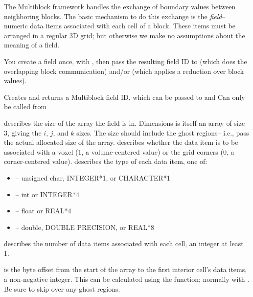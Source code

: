 \documentclass[10pt]{article}
\begin{document}
The Multiblock framework handles the exchange of boundary values 
between neighboring blocks.
The basic mechanism to do this exchange is the {\em field}-- numeric data items 
associated with each cell of a block. These items must be arranged in a regular
3D grid; but otherwise we make no assumptions about the meaning of a
field.

You create a field once, with , then pass the resulting 
field ID to  (which does the
overlapping block communication) and/or  (which 
applies a reduction over block values).


\vspace{0.2in}
     Creates and returns a Multiblock field ID, which can be passed to
 and   Can only be called from

      describes the size of the array the field is in.
	Dimensions is itself an array of size 3, giving the $i$, $j$, and $k$ sizes.
	The size should include the ghost regions-- i.e., pass the actual allocated
	size of the array.
      describes whether the data item is to be associated with
	a voxel (1, a volume-centered value) or the grid corners (0, a corner-centered
	value). 
      describes the type of each data item, one of:

     \begin{itemize}
        \item {}-- unsigned char, INTEGER*1, or CHARACTER*1
        \item {}-- int or INTEGER*4
        \item {}-- float or REAL*4
        \item {}-- double, DOUBLE PRECISION, or REAL*8
     \end{itemize}

      describes the number of data items associated with each
     cell, an integer at least 1.

      is the byte offset from the start of the array to the
     first interior cell's data items, a non-negative integer.  
     This can be calculated using the  function; normally with
     .  
     Be sure to skip over any ghost regions.
\end{document}
